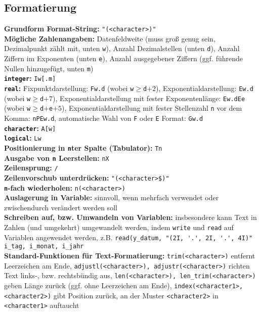 \documentclass[a4paper, twocolumn]{scrarticle}
\begin{document}
\subsection{Formatierung}\label{sec:formatierung}
\textbf{Grundform Format-String:} \lstinline|"(<character>)"|\\
\textbf{Mögliche Zahlenangaben:}  Datenfeldweite (muss groß genug sein, Dezimalpunkt zählt mit, unten \lstinline|w|), Anzahl Dezimalstellen (unten \lstinline|d|), Anzahl Ziffern im Exponenten (unten \lstinline|e|), Anzahl ausgegebener Ziffern (ggf. führende Nullen hinzugefügt, unten \lstinline|m|)\\
\textbf{\lstinline|integer|:} \lstinline|Iw[.m]|\\
\textbf{\lstinline|real|:} Fixpunktdarstellung: \lstinline|Fw.d| (wobei \lstinline|w|$\geq$\lstinline|d|$+2$), Exponentialdarstellung: \lstinline|Ew.d| (wobei \lstinline|w|$\geq$\lstinline|d|$+7$), Exponentialdarstellung mit fester Exponentenlänge: \lstinline|Ew.dEe| (wobei \lstinline|w|$\geq$\lstinline|d|$+$\lstinline|e|$+5$), Exponentialdarstellung mit fester Stellenzahl \lstinline|n| vor dem Komma: \lstinline|nPEw.d|, automatische Wahl von \lstinline|F| oder \lstinline|E| Format: \lstinline|Gw.d|\\
\textbf{\lstinline|character|:} \lstinline|A[w]|\\
\textbf{\lstinline|logical|:} \lstinline|Lw|\\
\textbf{Positionierung in \lstinline|n|ter Spalte (Tabulator):} \lstinline|Tn|\\
\textbf{Ausgabe von \lstinline|n| Leerstellen:} \lstinline|nX|\\
\textbf{Zeilensprung:} \lstinline|/|\\
\textbf{Zeilenvorschub unterdrücken:} \lstinline|"(<character>$)"|\\
\textbf{\lstinline|n|-fach wiederholen:} \lstinline|n(<character>)|\\
\textbf{Auslagerung in Variable:} sinnvoll, wenn mehrfach verwendet oder  zwischendurch verändert werden soll\\
\textbf{Schreiben auf, bzw. Umwandeln von Variablen:} insbesondere kann Text in Zahlen (und umgekehrt) umgewandelt werden, indem \lstinline|write| und \lstinline|read| auf Variablen angewendet werden, z.B. \lstinline|read(y_datum, "(2I, '.', 2I, '.', 4I)" i_tag, i_monat, i_jahr|\\
\textbf{Standard-Funktionen für Text-Formatierung:} \lstinline|trim(<character>)| entfernt Leerzeichen am Ende, \lstinline|adjustl(<character>), adjustr(<character>)| richten Text links-, bzw. rechtsbündig aus, \lstinline|len(<character>), len_trim(<character>)| geben Länge zurück (ggf. ohne Leerzeichen am Ende), \lstinline|index(<character1>, <character2>)| gibt Position zurück, an der Muster \lstinline|<character2>| in \lstinline|<character1>| auftaucht
\end{document}
